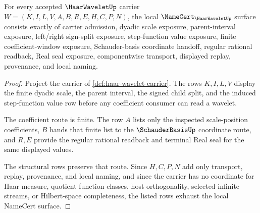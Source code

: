 \begin{theorem}
\label{thm:haar-wavelet-namecert-obligations}
For every accepted $\HaarWaveletUp$ carrier $W=(K,I,L,V,A,B,R,E,H,C,P,N)$, the local $\NameCert_{\HaarWaveletUp}$ surface consists exactly of carrier admission, dyadic scale exposure, parent-interval exposure, left/right sign-split exposure, step-function value exposure, finite coefficient-window exposure, Schauder-basis coordinate handoff, regular rational readback, Real seal exposure, componentwise transport, displayed replay, provenance, and local naming.
\end{theorem}
\begin{proof}
Project the carrier of \autoref{def:haar-wavelet-carrier}. The rows $K,I,L,V$ display the finite dyadic scale, the parent interval, the signed child split, and the induced step-function value row before any coefficient consumer can read a wavelet.

The coefficient route is finite. The row $A$ lists only the inspected scale-position coefficients, $B$ hands that finite list to the $\SchauderBasisUp$ coordinate route, and $R,E$ provide the regular rational readback and terminal Real seal for the same displayed values.

The structural rows preserve that route. Since $H,C,P,N$ add only transport, replay, provenance, and local naming, and since the carrier has no coordinate for Haar measure, quotient function classes, host orthogonality, selected infinite streams, or Hilbert-space completeness, the listed rows exhaust the local NameCert surface.
\end{proof}

